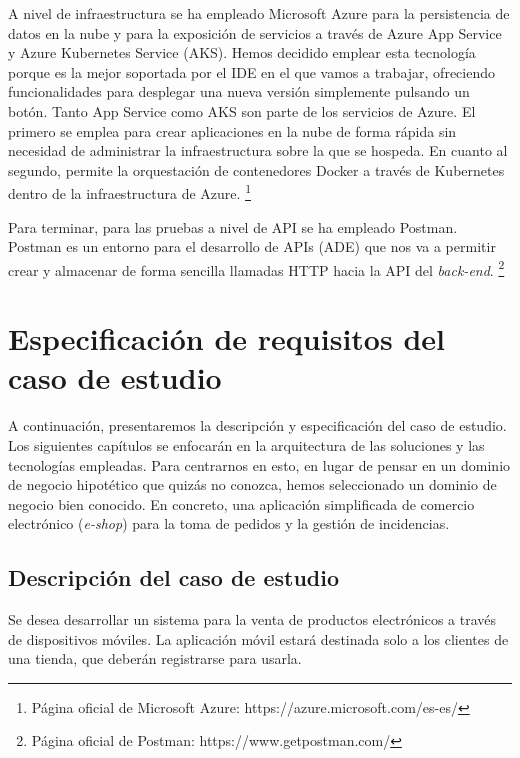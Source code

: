 \documentclass[11pt,spanish,listoffigures]{tfgetsinf}
\begin{document}
A nivel de infraestructura se ha empleado Microsoft Azure para la persistencia de datos en la nube y para la exposición de servicios a través de Azure App Service y Azure Kubernetes Service (AKS). Hemos decidido emplear esta tecnología porque es la mejor soportada por el IDE en el que vamos a trabajar, ofreciendo funcionalidades para desplegar una nueva versión simplemente pulsando un botón. Tanto App Service como AKS son parte de los servicios de Azure. El primero se emplea para crear aplicaciones en la nube de forma rápida sin necesidad de administrar la infraestructura sobre la que se hospeda. En cuanto al segundo, permite la orquestación de contenedores Docker a través de Kubernetes dentro de la infraestructura de Azure. \footnote{ Página oficial de Microsoft Azure: https://azure.microsoft.com/es-es/}

Para terminar, para las pruebas a nivel de API se ha empleado Postman. Postman es un entorno para el desarrollo de APIs (ADE) que nos va a permitir crear y almacenar de forma sencilla llamadas HTTP hacia la API del \textit{back-end}. \footnote{ Página oficial de Postman: https://www.getpostman.com/}


\chapter{Especificación de requisitos del caso de estudio}

A continuación, presentaremos la descripción y especificación del caso de estudio. Los siguientes capítulos se enfocarán en la arquitectura de las soluciones y las tecnologías empleadas. Para centrarnos en esto, en lugar de pensar en un dominio de negocio hipotético que quizás no conozca, hemos seleccionado un dominio de negocio bien conocido. En concreto, una aplicación simplificada de comercio electrónico (\textit{e-shop}) para la toma de pedidos y la gestión de incidencias.

\section{Descripción del caso de estudio}

Se desea desarrollar un sistema para la venta de productos electrónicos a través de dispositivos móviles. La aplicación móvil estará destinada solo a los clientes de una tienda, que deberán registrarse para usarla.
\end{document}
